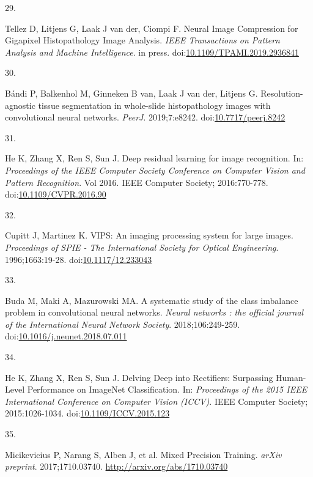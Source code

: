 \documentclass[
  12pt,
  a5,margin=2cmpaper,
]{article}
\newlength{\cslhangindent}
\newlength{\csllabelwidth}
\newlength{\cslentryspacingunit} %
\newenvironment{CSLReferences}[2] %
 {%
  \setlength{\parindent}{0pt}
  \ifodd #1
  \let\oldpar\par
  \def\par{\hangindent=\cslhangindent\oldpar}
  \fi
  \setlength{\parskip}{#2\cslentryspacingunit}
 }%
 {}
\newcommand{\CSLLeftMargin}[1]{\parbox[t]{\csllabelwidth}{#1}}
\newcommand{\CSLRightInline}[1]{\parbox[t]{\linewidth - \csllabelwidth}{#1}\break}
\begin{document}
\begin{CSLReferences}{0}{0}
\leavevmode{}%
\CSLLeftMargin{29. }%
\CSLRightInline{Tellez D, Litjens G, Laak J van der, Ciompi F. {Neural
Image Compression for Gigapixel Histopathology Image Analysis}.
\emph{IEEE Transactions on Pattern Analysis and Machine Intelligence}.
in press.
doi:\href{https://doi.org/10.1109/TPAMI.2019.2936841}{10.1109/TPAMI.2019.2936841}}

\leavevmode{}%
\CSLLeftMargin{30. }%
\CSLRightInline{Bándi P, Balkenhol M, Ginneken B van, Laak J van der,
Litjens G. {Resolution-agnostic tissue segmentation in whole-slide
histopathology images with convolutional neural networks.} \emph{PeerJ}.
2019;7:e8242.
doi:\href{https://doi.org/10.7717/peerj.8242}{10.7717/peerj.8242}}

\leavevmode{}%
\CSLLeftMargin{31. }%
\CSLRightInline{He K, Zhang X, Ren S, Sun J. {Deep residual learning for
image recognition}. In: \emph{Proceedings of the IEEE Computer Society
Conference on Computer Vision and Pattern Recognition}. Vol 2016. IEEE
Computer Society; 2016:770-778.
doi:\href{https://doi.org/10.1109/CVPR.2016.90}{10.1109/CVPR.2016.90}}

\leavevmode{}%
\CSLLeftMargin{32. }%
\CSLRightInline{Cupitt J, Martinez K. {VIPS: An imaging processing
system for large images}. \emph{Proceedings of SPIE - The International
Society for Optical Engineering}. 1996;1663:19-28.
doi:\href{https://doi.org/10.1117/12.233043}{10.1117/12.233043}}

\leavevmode{}%
\CSLLeftMargin{33. }%
\CSLRightInline{Buda M, Maki A, Mazurowski MA. {A systematic study of
the class imbalance problem in convolutional neural networks.}
\emph{Neural networks : the official journal of the International Neural
Network Society}. 2018;106:249-259.
doi:\href{https://doi.org/10.1016/j.neunet.2018.07.011}{10.1016/j.neunet.2018.07.011}}

\leavevmode{}%
\CSLLeftMargin{34. }%
\CSLRightInline{He K, Zhang X, Ren S, Sun J. {Delving Deep into
Rectifiers: Surpassing Human-Level Performance on ImageNet
Classification}. In: \emph{Proceedings of the 2015 IEEE International
Conference on Computer Vision (ICCV)}. IEEE Computer Society;
2015:1026-1034.
doi:\href{https://doi.org/10.1109/ICCV.2015.123}{10.1109/ICCV.2015.123}}

\leavevmode{}%
\CSLLeftMargin{35. }%
\CSLRightInline{Micikevicius P, Narang S, Alben J, et al. {Mixed
Precision Training}. \emph{arXiv preprint}. 2017;1710.03740.
\url{http://arxiv.org/abs/1710.03740}}


\end{CSLReferences}
\end{document}
